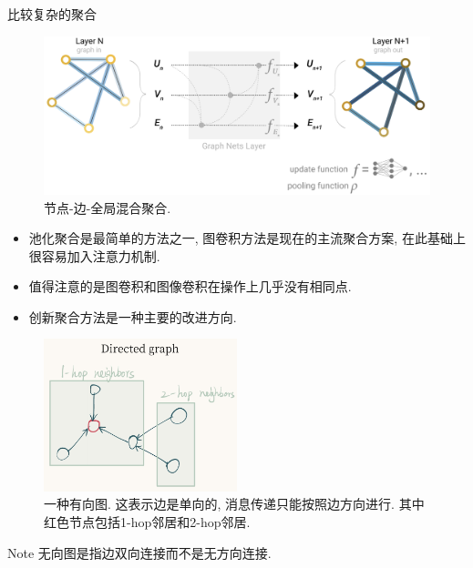 \documentclass{beamer}
\begin{document}
\begin{frame}{比较复杂的聚合}
    \begin{figure}
        \includegraphics[width=\textwidth]{节点边全局聚合.png}
        \caption{节点-边-全局混合聚合.}
    \end{figure}
\end{frame}

\begin{frame}
    \begin{itemize}
        \item 池化聚合是最简单的方法之一, 图卷积方法是现在的主流聚合方案, 在此基础上很容易加入注意力机制.
        \item 值得注意的是图卷积和图像卷积在操作上几乎没有相同点.
        \item 创新聚合方法是一种主要的改进方向.
    \end{itemize}
\end{frame}

\begin{frame}
    \begin{figure}
        \includegraphics[width=0.5\textwidth]{有向图.png}
        \caption{一种有向图. 这表示边是单向的, 消息传递只能按照边方向进行. 其中红色节点包括1-hop邻居和2-hop邻居.}
    \end{figure}
    \begin{block}{Note}
        无向图是指边双向连接而不是无方向连接.
    \end{block}
\end{frame}
\end{document}
